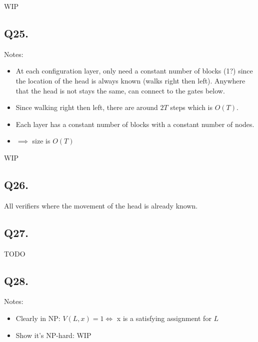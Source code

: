 \documentclass[letterpaper]{article}
\begin{document}
WIP

\subsection*{Q25.}

Notes:
\begin{itemize}
  \item At each configuration layer, only need a constant number of blocks (1?)
        since the location of the head is always known (walks right then left).
        Anywhere that the head is not stays the same, can connect to the gates below.
  \item Since walking right then left, there are around $2T$ steps which is $O(T)$.
  \item Each layer has a constant number of blocks with a constant number of nodes.
  \item $\implies$ size is $O(T)$
\end{itemize}

WIP

\subsection*{Q26.}

All verifiers where the movement of the head is already known.

\subsection*{Q27.}
TODO

\subsection*{Q28.}

Notes:
\begin{itemize}
  \item Clearly in NP: $V(L,x) = 1 \iff $ x is a satisfying assignment for $L$
  \item Show it's NP-hard: WIP
\end{itemize}
\end{document}
